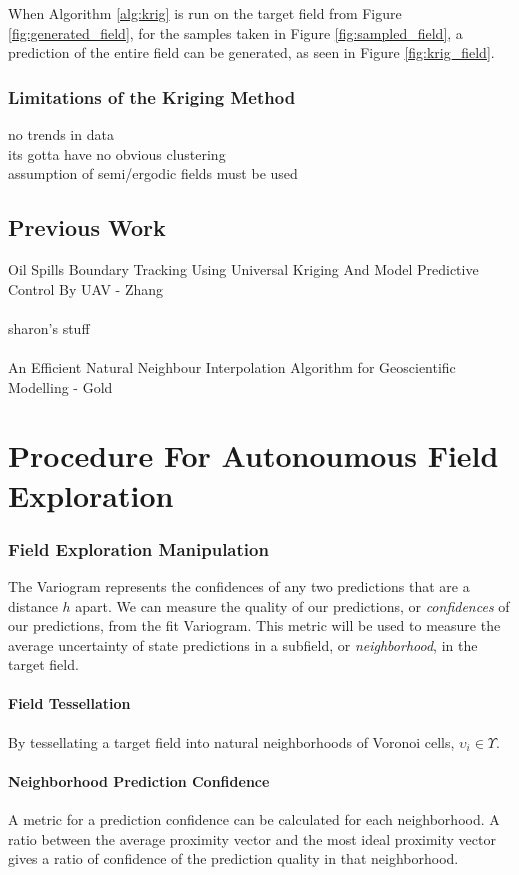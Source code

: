 \documentclass[11pt]{ucthesis}
\begin{document}
When Algorithm \ref{alg:krig} is run on the target field from Figure \ref{fig:generated_field}, for the samples taken in Figure \ref{fig:sampled_field}, a prediction of the entire field can be generated, as seen in Figure \ref{fig:krig_field}.


\section{Limitations of the Kriging Method}
no trends in data\\
its gotta have no obvious clustering \\
assumption of semi/ergodic fields must be used

\chapter{Previous Work}
Oil Spills Boundary Tracking Using Universal Kriging
And Model Predictive Control By UAV - Zhang\\\\
sharon's stuff\\\\
An Efficient Natural Neighbour Interpolation
Algorithm for Geoscientific Modelling - Gold

\part{Procedure For Autonoumous Field Exploration}
\section{Field Exploration Manipulation}
The Variogram represents the confidences of any two predictions that are a distance $h$ apart. We can measure the quality of our predictions, or \textit{confidences} of our predictions, from the fit Variogram. This metric will be used to measure the average uncertainty of state predictions in a subfield, or \textit{neighborhood}, in the target field.

\subsection{Field Tessellation}
By tessellating a target field into natural neighborhoods of Voronoi cells, $\upsilon_i \in \Upsilon$. %

\subsection{Neighborhood Prediction Confidence}
A metric for a prediction confidence can be calculated for each neighborhood. A ratio between the average proximity vector and the most ideal proximity vector gives a ratio of confidence of the prediction quality in that neighborhood. %
\end{document}
